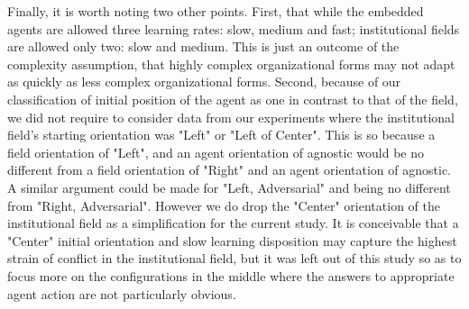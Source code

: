 \documentclass[12pt,letterpaper]{article}
\begin{document}
\noindent Finally, it is worth noting two other points. First, that while the embedded agents are allowed three learning rates: slow, medium and fast; institutional fields are allowed only two: slow and medium. This is just an outcome of the complexity assumption,  that highly complex organizational forms may not adapt as quickly as less complex organizational forms. Second, because of our classification of initial position of the agent as one in contrast to that of the field, we did not require to consider data from our experiments where the institutional field's starting orientation was "Left" or "Left of Center". This is so because a field orientation of "Left", and an agent orientation of agnostic would be no different from a field orientation of "Right" and an agent orientation of agnostic. A similar argument could be made for "Left, Adversarial" and being no different from "Right, Adversarial". However we do drop the "Center" orientation of the institutional field as a simplification for the current study. It is conceivable that a "Center" initial orientation and slow learning disposition may capture the highest strain of conflict in the institutional field, but it was left out of this study so as to focus more on the configurations in the middle where the answers to appropriate agent action are not particularly obvious.\\\\
\end{document}
